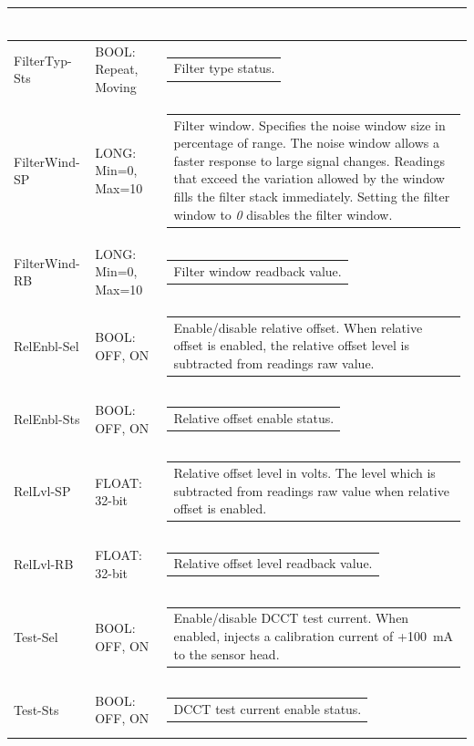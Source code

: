 \documentclass[openany]{article}
\begin{document}
\begin{longtable}{| m{3.0cm} m{4.5cm} m{7.0cm} |}
\begin{tabular}{@{}m{6cm}@{}}
						\end{tabular} \\ \hline
		FilterTyp-Sts & BOOL: Repeat, Moving & \begin{tabular}{@{}m{6cm}@{}}
	    					Filter type status.
						\end{tabular} \\ \hline
		FilterWind-SP & LONG: Min=0, Max=10 & \begin{tabular}{@{}m{6cm}@{}}
	    					Filter window. Specifies the noise window size in percentage of range. The noise window allows a faster response to large signal changes. Readings that exceed the variation allowed by the window fills the filter stack immediately. Setting the filter window to \emph{0} disables the filter window.
						\end{tabular} \\ \hline
		FilterWind-RB & LONG: Min=0, Max=10 & \begin{tabular}{@{}m{6cm}@{}}
	    					Filter window readback value.
						\end{tabular} \\ \hline
		RelEnbl-Sel & BOOL: OFF, ON & \begin{tabular}{@{}m{6cm}@{}}
	    					Enable/disable relative offset. When relative offset is enabled, the relative offset level is subtracted from readings raw value.
						\end{tabular} \\ \hline
		RelEnbl-Sts & BOOL: OFF, ON & \begin{tabular}{@{}m{6cm}@{}}
	    					Relative offset enable status.
						\end{tabular} \\ \hline
		RelLvl-SP & FLOAT: 32-bit & \begin{tabular}{@{}m{6cm}@{}}
	    					Relative offset level in volts. The level which is subtracted from readings raw value when relative offset is enabled.
						\end{tabular} \\ \hline
		RelLvl-RB & FLOAT: 32-bit & \begin{tabular}{@{}m{6cm}@{}}
	    					Relative offset level readback value.
						\end{tabular} \\ \hline
		Test-Sel & BOOL: OFF, ON & \begin{tabular}{@{}m{6cm}@{}}
	    					Enable/disable DCCT test current. When enabled, injects a calibration current of +\SI{100}{\milli\ampere} to the sensor head.
						\end{tabular} \\ \hline
		Test-Sts & BOOL: OFF, ON & \begin{tabular}{@{}m{6cm}@{}}
 						DCCT test current enable status.
						\end{tabular} \\ \hline
	\end{longtable}
\end{document}

